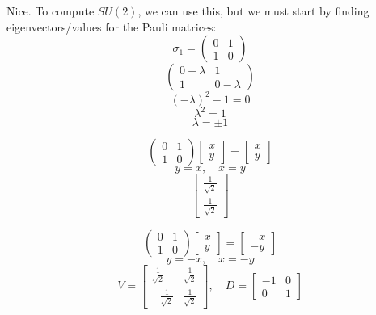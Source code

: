 \documentclass{article}
\begin{document}
Nice. To compute $SU(2)$, we can use this, but we must start by finding eigenvectors/values for the Pauli matrices: 
\[ \sigma_1 = \begin{pmatrix} 0 & 1 \\ 1 & 0 \end{pmatrix}  \]
\[ \begin{pmatrix} 0-\lambda & 1 \\ 1 & 0-\lambda \end{pmatrix}  \]
\[ (-\lambda)^2 -1 = 0 \]
\[ \lambda^2 = 1 \]
\[ \lambda = \pm 1 \]

\[ \begin{pmatrix} 0 & 1 \\ 1 & 0 \end{pmatrix} \begin{bmatrix}
    x \\ y
\end{bmatrix} = \begin{bmatrix}
    x \\ y
\end{bmatrix} \]
\[ y = x, \quad x = y \]
\[ \begin{bmatrix}
    \frac{1}{\sqrt{2}} \\ \frac{1}{\sqrt{2}}
\end{bmatrix} \]

\[ \begin{pmatrix} 0 & 1 \\ 1 & 0 \end{pmatrix} \begin{bmatrix}
    x \\ y
\end{bmatrix} = \begin{bmatrix}
    -x \\ -y
\end{bmatrix} \]
\[ y = -x, \quad x = -y \]
\[ V = \begin{bmatrix}
    \frac{1}{\sqrt{2}} & \frac{1}{\sqrt{2}} \\ 
    -\frac{1}{\sqrt{2}} & \frac{1}{\sqrt{2}}
\end{bmatrix}, \quad D = \begin{bmatrix}
    -1 & 0 \\ 0 & 1 
\end{bmatrix} \]
\end{document}

